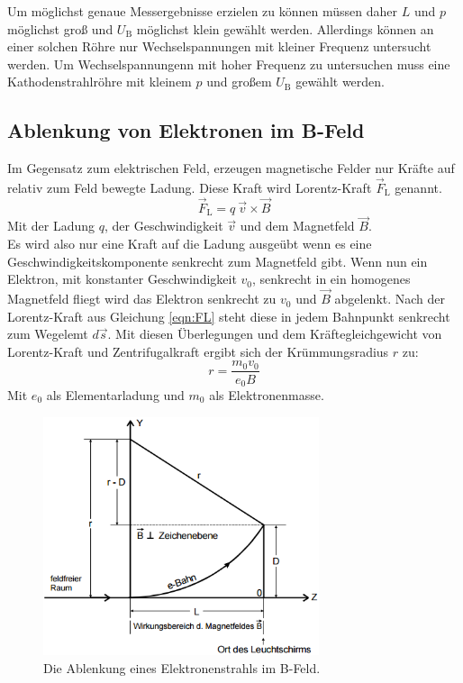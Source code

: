 Um möglichst genaue Messergebnisse erzielen zu können müssen daher $L$ und $p$ möglichst groß und $U_\text{B}$ möglichst klein gewählt werden. Allerdings können an einer solchen Röhre nur Wechselspannungen mit kleiner Frequenz untersucht werden. Um Wechselspannungenn mit hoher Frequenz zu untersuchen muss eine Kathodenstrahlröhre mit kleinem $p$ und großem $U_\text{B}$ gewählt werden.

\subsection{Ablenkung von Elektronen im B-Feld}
Im Gegensatz zum elektrischen Feld, erzeugen magnetische Felder nur Kräfte auf relativ zum Feld bewegte Ladung. Diese Kraft wird Lorentz-Kraft $\vec{F}_\text{L}$ genannt.
\begin{equation}
	\vec{F}_\text{L} = q \ \vec{v} \times \vec{B}
	\label{eqn:FL}
\end{equation}
Mit der Ladung $q$, der Geschwindigkeit $\vec{v}$ und dem Magnetfeld $\vec{B}$.\\
Es wird also nur eine Kraft auf die Ladung ausgeübt wenn es eine Geschwindigkeitskomponente senkrecht zum Magnetfeld gibt. Wenn nun ein Elektron, mit konstanter Geschwindigkeit $v_0$, senkrecht in ein homogenes Magnetfeld fliegt wird das Elektron senkrecht zu $v_0$ und $\vec{B}$ abgelenkt. Nach der Lorentz-Kraft aus Gleichung \eqref{eqn:FL} steht diese in jedem Bahnpunkt senkrecht zum Wegelemt $d \vec{s}$. Mit diesen Überlegungen und dem Kräftegleichgewicht von Lorentz-Kraft und Zentrifugalkraft ergibt sich der Krümmungsradius $r$ zu:
\begin{equation}
	r = \frac{m_0 v_0}{e_0 B}
	\label{eqn:r}
\end{equation}
Mit $e_0$ als Elementarladung und $m_0$ als Elektronenmasse. \\

\begin{figure}[H]
	\centering
	\includegraphics[height=7cm]{picture/AblenkungBFeld}
	\caption{Die Ablenkung eines Elektronenstrahls im B-Feld. \cite[2]{V502}}
	\label{fig:AblenkungB}
\end{figure}

